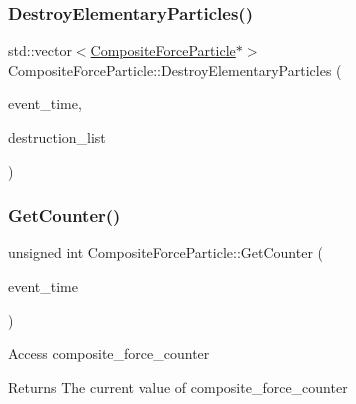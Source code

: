 \mbox{\label{class_composite_force_particle_a602ef5e477db576e47c36436b83f80f5}} 
\subsubsection{\texorpdfstring{Destroy\+Elementary\+Particles()}{DestroyElementaryParticles()}}
{\footnotesize\ttfamily std\+::vector$<$\mbox{\hyperlink{class_composite_force_particle}{Composite\+Force\+Particle}}$\ast$$>$ Composite\+Force\+Particle\+::\+Destroy\+Elementary\+Particles (\begin{DoxyParamCaption}\item[{std\+::chrono\+::time\+\_\+point$<$ \mbox{\hyperlink{universe_8h_a0ef8d951d1ca5ab3cfaf7ab4c7a6fd80}{Clock}} $>$}]{event\+\_\+time,  }\item[{std\+::vector$<$ \mbox{\hyperlink{class_composite_force_particle}{Composite\+Force\+Particle}} $\ast$$>$}]{destruction\+\_\+list }\end{DoxyParamCaption})}

\mbox{\label{class_composite_force_particle_ae0bc57309f04b784b2c23b82db869b25}} 
\subsubsection{\texorpdfstring{Get\+Counter()}{GetCounter()}}
{\footnotesize\ttfamily unsigned int Composite\+Force\+Particle\+::\+Get\+Counter (\begin{DoxyParamCaption}\item[{std\+::chrono\+::time\+\_\+point$<$ \mbox{\hyperlink{universe_8h_a0ef8d951d1ca5ab3cfaf7ab4c7a6fd80}{Clock}} $>$}]{event\+\_\+time }\end{DoxyParamCaption})\hspace{0.3cm}{\ttfamily [inline]}}

Access composite\+\_\+force\+\_\+counter \begin{DoxyReturn}{Returns}
The current value of composite\+\_\+force\+\_\+counter 
\end{DoxyReturn}


